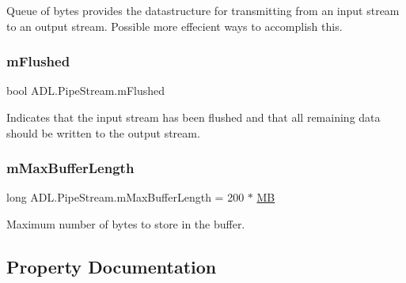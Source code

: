 Queue of bytes provides the datastructure for transmitting from an input stream to an output stream. Possible more effecient ways to accomplish this. 

\mbox{\label{class_a_d_l_1_1_pipe_stream_a186ff66fbf297d1491d7ca528326c3da}} 
\subsubsection{\texorpdfstring{m\+Flushed}{mFlushed}}
{\footnotesize\ttfamily bool A\+D\+L.\+Pipe\+Stream.\+m\+Flushed\hspace{0.3cm}{\ttfamily [private]}}



Indicates that the input stream has been flushed and that all remaining data should be written to the output stream. 

\mbox{\label{class_a_d_l_1_1_pipe_stream_af8cc7772cf7ae02b1890ab8c58d0cbad}} 
\subsubsection{\texorpdfstring{m\+Max\+Buffer\+Length}{mMaxBufferLength}}
{\footnotesize\ttfamily long A\+D\+L.\+Pipe\+Stream.\+m\+Max\+Buffer\+Length = 200 $\ast$ \mbox{\hyperlink{class_a_d_l_1_1_pipe_stream_ad4a04360b3d017567a0fd48defd434d0}{MB}}\hspace{0.3cm}{\ttfamily [private]}}



Maximum number of bytes to store in the buffer. 



\subsection{Property Documentation}
\mbox{\label{class_a_d_l_1_1_pipe_stream_af05e530e849bfee481290e8139f27379}} 
